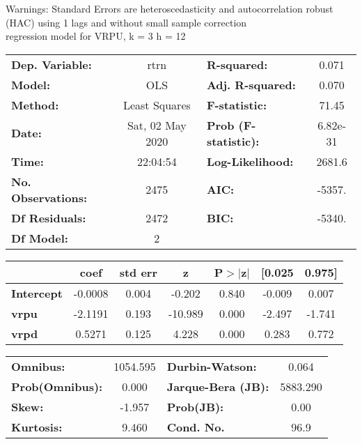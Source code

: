 Warnings: \newline
 [1] Standard Errors are heteroscedasticity and autocorrelation robust (HAC) using 1 lags and without small sample correction\\ 

regression model for VRPU, k = 3 h = 12\begin{center}
\begin{tabular}{lclc}
\toprule
\textbf{Dep. Variable:}    &       rtrn       & \textbf{  R-squared:         } &     0.071   \\
\textbf{Model:}            &       OLS        & \textbf{  Adj. R-squared:    } &     0.070   \\
\textbf{Method:}           &  Least Squares   & \textbf{  F-statistic:       } &     71.45   \\
\textbf{Date:}             & Sat, 02 May 2020 & \textbf{  Prob (F-statistic):} &  6.82e-31   \\
\textbf{Time:}             &     22:04:54     & \textbf{  Log-Likelihood:    } &    2681.6   \\
\textbf{No. Observations:} &        2475      & \textbf{  AIC:               } &    -5357.   \\
\textbf{Df Residuals:}     &        2472      & \textbf{  BIC:               } &    -5340.   \\
\textbf{Df Model:}         &           2      & \textbf{                     } &             \\
\bottomrule
\end{tabular}
\begin{tabular}{lcccccc}
                   & \textbf{coef} & \textbf{std err} & \textbf{z} & \textbf{P$> |$z$|$} & \textbf{[0.025} & \textbf{0.975]}  \\
\midrule
\textbf{Intercept} &      -0.0008  &        0.004     &    -0.202  &         0.840        &       -0.009    &        0.007     \\
\textbf{vrpu}      &      -2.1191  &        0.193     &   -10.989  &         0.000        &       -2.497    &       -1.741     \\
\textbf{vrpd}      &       0.5271  &        0.125     &     4.228  &         0.000        &        0.283    &        0.772     \\
\bottomrule
\end{tabular}
\begin{tabular}{lclc}
\textbf{Omnibus:}       & 1054.595 & \textbf{  Durbin-Watson:     } &    0.064  \\
\textbf{Prob(Omnibus):} &   0.000  & \textbf{  Jarque-Bera (JB):  } & 5883.290  \\
\textbf{Skew:}          &  -1.957  & \textbf{  Prob(JB):          } &     0.00  \\
\textbf{Kurtosis:}      &   9.460  & \textbf{  Cond. No.          } &     96.9  \\
\bottomrule
\end{tabular}
\end{center}

